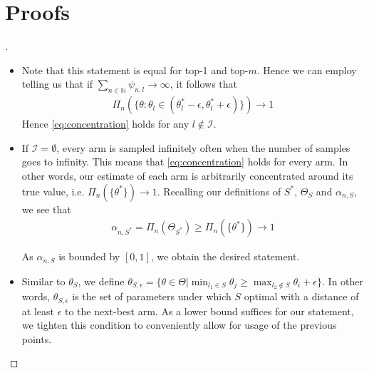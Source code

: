 \section{Proofs}\label{section:txts_proofs}
\begin{proof}[]

  \begin{itemize}
  \item Note that this statement is equal for top-1 and top-$m$. Hence we can
  employ  telling us that if $\sum_{n \in \mathbb{N}}
  \psi_{n, l} \rightarrow \infty$, it follows that
  \begin{align}
    \Pi_n(\{\theta: \theta_l \in (\theta^*_l - \epsilon, \theta^*_l +
        \epsilon)\}) \rightarrow 1 \label{eq:concentration}
  \end{align}
  Hence \eqref{eq:concentration} holds for any $l \notin \mathcal{I}$. \item If
  $\mathcal{I} = \emptyset$, every arm is sampled infinitely often when the
  number of samples goes to infinity. This means that \eqref{eq:concentration}
  holds for every arm. In other words, our estimate of each arm is arbitrarily
  concentrated around its true value, i.e. $\Pi_n(\{\theta^*\}) \rightarrow 1$.
  Recalling our definitions of $S^*$, $\Theta_S$ and $\alpha_{n, S}$, we see
  that
  \begin{align}
    \alpha_{n, S^*} = \Pi_n(\Theta_{S^*}) \geq \Pi_n(\{\theta^*\}) \rightarrow 1
  \end{align}

  As $\alpha_{n, S}$ is bounded by $[0, 1]$, we obtain the desired statement.

  \item Similar to $\theta_S$, we define $\theta_{S, \epsilon} = \{\theta \in
  \Theta | \min_{l_1 \in S} \theta_j \geq \max_{l_2 \notin S} \theta_i +
  \epsilon\}$. In other words, $\theta_{S,\epsilon}$ is the set of parameters
  under which $S$ optimal with a distance of at least $\epsilon$ to the
  next-best arm. As a lower bound suffices for our statement, we tighten this
  condition to conveniently allow for usage of the previous points.


\end{itemize}
\end{proof}
